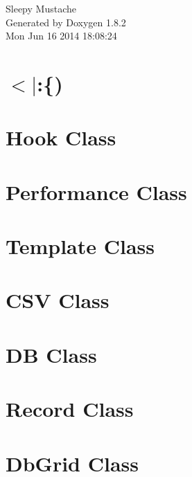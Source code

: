 \documentclass{book}
\begin{document}
\hypersetup{pageanchor=false,citecolor=blue}
\begin{titlepage}
\vspace*{7cm}
\begin{center}
{\Large Sleepy Mustache }\\
\vspace*{1cm}
{\large Generated by Doxygen 1.8.2}\\
\vspace*{0.5cm}
{\small Mon Jun 16 2014 18:08:24}\\
\end{center}
\end{titlepage}
\clearemptydoublepage
{}
\tableofcontents
\clearemptydoublepage
{}
\hypersetup{pageanchor=true,citecolor=blue}
\chapter{$<$$|$\-:\{)}
\label{index}\hypertarget{index}{}
\chapter{Hook Class}
\label{hooks1}
\hypertarget{hooks1}{}

\chapter{Performance Class}
\label{perf1}
\hypertarget{perf1}{}

\chapter{Template Class}
\label{template1}
\hypertarget{template1}{}

\chapter{C\-S\-V Class}
\label{csv1}
\hypertarget{csv1}{}

\chapter{D\-B Class}
\label{db1}
\hypertarget{db1}{}

\chapter{Record Class}
\label{record1}
\hypertarget{record1}{}

\chapter{Db\-Grid Class}
\label{dbgrid1}
\hypertarget{dbgrid1}{}

\end{document}
